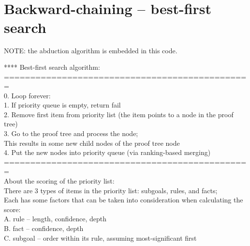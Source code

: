\section{Backward-chaining -- best-first search}

NOTE:  the abduction algorithm is embedded in this code.

**** Best-first search algorithm:\\
===============================================\\
0. Loop forever:\\
1.     If priority queue is empty, return fail\\
2.     Remove first item from priority list (the item points to a node in the proof tree)\\
3.     Go to the proof tree and process the node;\\
           This results in some new child nodes of the proof tree node\\
4.     Put the new nodes into priority queue (via ranking-based merging)\\
===============================================\\
About the scoring of the priority list:\\
   There are 3 types of items in the priority list:  subgoals, rules, and facts;\\
   Each has some factors that can be taken into consideration when calculating the score:\\
   A. rule -- length, confidence, depth\\
   B. fact -- confidence, depth\\
   C. subgoal -- order within its rule, assuming most-significant first

